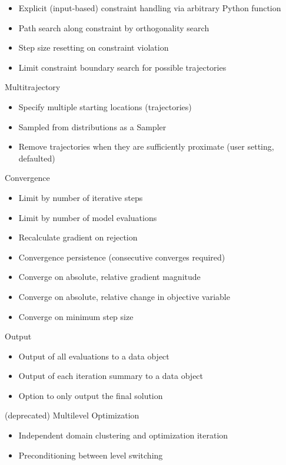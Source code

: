 \documentclass[11pt]{article}
\begin{document}
\begin{section}
    \begin{itemize}
      \item Explicit (input-based) constraint handling via arbitrary Python function
      \item Path search along constraint by orthogonality search
      \item Step size resetting on constraint violation
      \item Limit constraint boundary search for possible trajectories
    \end{itemize}
  \item Multitrajectory
    \begin{itemize}
      \item Specify multiple starting locations (trajectories)
      \item Sampled from distributions as a Sampler
      \item Remove trajectories when they are sufficiently proximate (user setting, defaulted)
    \end{itemize}
  \item Convergence
    \begin{itemize}
      \item Limit by number of iterative steps
      \item Limit by number of model evaluations
      \item Recalculate gradient on rejection
      \item Convergence persistence (consecutive converges required)
      \item Converge on absolute, relative gradient magnitude
      \item Converge on absolute, relative change in objective variable
      \item Converge on minimum step size
    \end{itemize}
  \item Output
    \begin{itemize}
      \item Output of all evaluations to a data object
      \item Output of each iteration summary to a data object
      \item Option to only output the final solution
    \end{itemize}
  \item (deprecated) Multilevel Optimization
    \begin{itemize}
      \item Independent domain clustering and optimization iteration
      \item Preconditioning between level switching
    \end{itemize}
\end{section}
\end{document}
